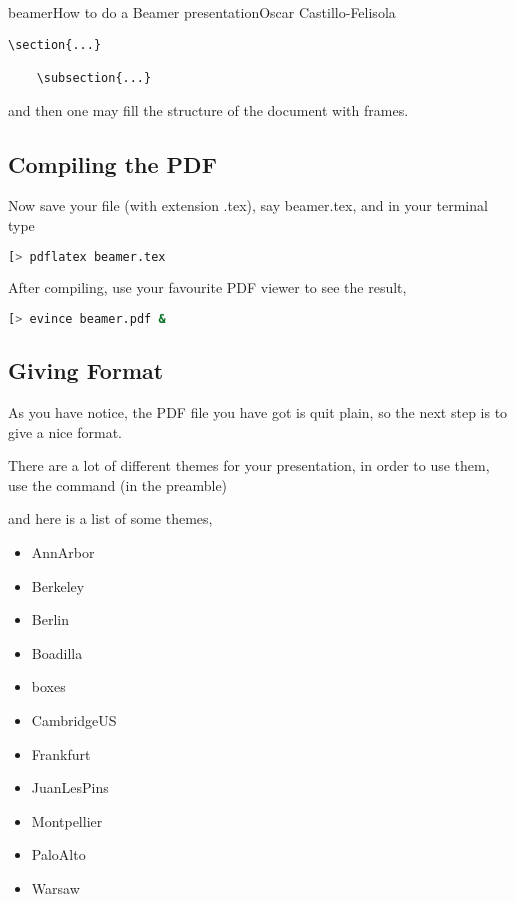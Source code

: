 \begin{article}[2]{beamer}{How to do a Beamer presentation}{Oscar Castillo-Felisola}
  \begin{lstlisting}[style=LaTeX]
    \section{...}

    \subsection{...}
  \end{lstlisting}

  and then one may fill the structure of the document with frames.
  \subsection{Compiling the PDF}

  Now save your file (with extension .tex), say  beamer.tex, and in your terminal type

  \begin{lstlisting}[language=bash,style=StyleCommand]
    [> pdflatex beamer.tex
  \end{lstlisting}

  After compiling, use your favourite PDF viewer to see the result,

  \begin{lstlisting}[language=bash,style=StyleCommand]
    [> evince beamer.pdf &
  \end{lstlisting}

  \subsection{Giving Format}

  As you have notice, the PDF file you have got is quit plain, so the next step is to give a nice format.

  There are a lot of different themes for your presentation, in order to use them, use the command (in the preamble)


  and here is a list of some themes,

  \begin{itemize}
  \item AnnArbor
  \item Berkeley
  \item Berlin
  \item Boadilla
  \item boxes
  \item CambridgeUS
  \item Frankfurt
  \item JuanLesPins
  \item Montpellier
  \item PaloAlto
  \item Warsaw
  \end{itemize}


\end{article}
